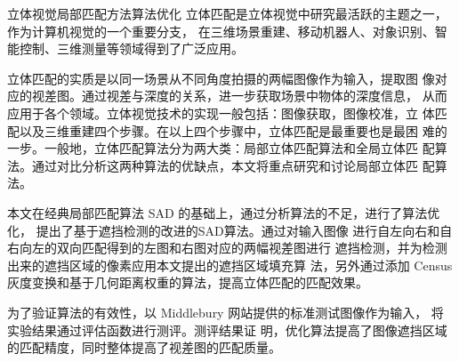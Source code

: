 \begin{Cabstract}{立体视觉}{局部匹配方法}{算法优化}{}{}
立体匹配是立体视觉中研究最活跃的主题之一，作为计算机视觉的一个重要分支，
在三维场景重建、移动机器人、对象识别、智能控制、三维测量等领域得到了广泛应用。 

立体匹配的实质是以同一场景从不同角度拍摄的两幅图像作为输入，提取图
像对应的视差图。通过视差与深度的关系，进一步获取场景中物体的深度信息，
从而应用于各个领域。立体视觉技术的实现一般包括：图像获取，图像校准，立
体匹配以及三维重建四个步骤。在以上四个步骤中，立体匹配是最重要也是最困
难的一步。一般地，立体匹配算法分为两大类：局部立体匹配算法和全局立体匹
配算法。通过对比分析这两种算法的优缺点，本文将重点研究和讨论局部立体匹
配算法。

本文在经典局部匹配算法 SAD 的基础上，通过分析算法的不足，进行了算法优化，
提出了基于遮挡检测的改进的SAD算法。通过对输入图像
进行自左向右和自右向左的双向匹配得到的左图和右图对应的两幅视差图进行
遮挡检测，并为检测出来的遮挡区域的像素应用本文提出的遮挡区域填充算
法，另外通过添加 Census 灰度变换和基于几何距离权重的算法，提高立体匹配的匹配效果。 

为了验证算法的有效性，以 Middlebury 网站提供的标准测试图像作为输入，
将实验结果通过评估函数进行测评。测评结果证
明，优化算法提高了图像遮挡区域的匹配精度，同时整体提高了视差图的匹配质量。
\end{Cabstract}

